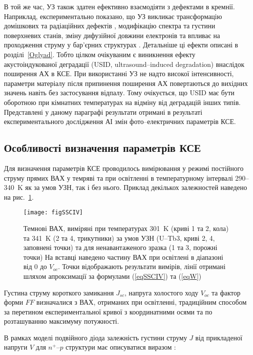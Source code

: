 В той же час, УЗ також здатен ефективно взаємодіяти з дефектами в кремнії.
Наприклад,  експериментально показано, що УЗ викликає трансформацію домішкових та радіаційних дефектів \cite{Korotchenkov1995,Ostapenko1995,UST:Medvid,YOlikh:SupMicr},
модифікацію спектра \cite{Zaver:2008} та густини \cite{Mirsagatov} поверхневих станів,
зміну дифузійної довжини електронів \cite{Ostapenko1999,Ostrovskii2001}
та впливає на проходження струму у бар'єрних структурах \cite{Davletova2009,Davletova2008,YOlikh2005}.
Детальніше ці ефекти описані в розділі~\ref{Oglyad}.
Тобто цілком очікуваним є виникнення ефекту акустоіндукованої деградації (USID, ultrasound--induced degradation) внаслідок поширення АХ в КСЕ.
При використанні УЗ не надто високої інтенсивності, параметри матеріалу після припинення поширення АХ повертаються до вихідних значень \cite{Ostapenko1999,Ostrovskii2001,Korotchenkov1995} навіть без застосування відпалу.
Тому очікується, що USID має бути оборотною при кімнатних температурах на відміну від деградацій інших типів.
Представлені у даному параграфі результати отримані в результаті експериментального дослідження АІ змін фото--електричних параметрів КСЕ.

\subsection{Особливості визначення параметрів КСЕ\label{sbSSCMethod}}
Для визначення параметрів КСЕ проводилось вимірювання у режимі постійного струму прямих ВАХ у темряві та при освітленні
в температурному інтервалі  290--340~K як за умов УЗН, так і без нього.
Приклад декількох залежностей наведено на рис.~\ref{figSSCIV}.
\begin{figure}
\center
\texttt{[image: figSSCIV]}%
\caption{\label{figSSCIV}
Темнові ВАХ, виміряні при температурах 301~K (криві 1 та 2, кола) та 341~K (2 та 4, трикутники)
за умов УЗН (U--Tb3, криві 2, 4, заповнені точки) та для ненавантаженого зразка (1 та 3, порожні точки)
На вставці наведено частину ВАХ при освітлені в діапазоні від 0 до $V_{oc}$.
Точки відображають результати вимірів, лінії отримані шляхом апроксимації за формулами (\ref{eqSSCIV}) та (\ref{eqW})
}%
\end{figure}
Густина струму короткого замикання $J_{sc}$, напруга холостого ходу $V_{oc}$ та фактор форми $F\!F$ визначалися з ВАХ, отриманих при освітленні,
традиційним способом за перетином експериментальної кривої з координатними осями  та по розташуванню максимуму потужності.

В рамках моделі подвійного діода залежність густини струму $J$ від прикладеної напруги $V$ для  $n^+$--$p$ структури має описуватися
 виразом \cite{2Diod:Ishaque,2Diod:Buhler}:

